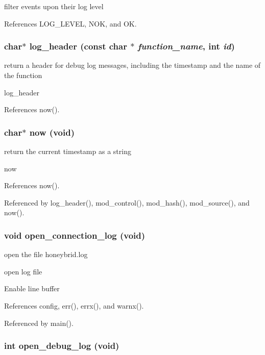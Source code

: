 filter events upon their log level 

References LOG\_\-LEVEL, NOK, and OK.
\subsubsection[{log\_\-header}]{\setlength{\rightskip}{0pt plus 5cm}char$\ast$ log\_\-header (const char $\ast$ {\em function\_\-name}, \/  int {\em id})}\label{log_8h_8a84b75ac92d0036fd17d2c2705cfcc4}


return a header for debug log messages, including the timestamp and the name of the function 

log\_\-header 

References now().
\subsubsection[{now}]{\setlength{\rightskip}{0pt plus 5cm}char$\ast$ now (void)}\label{log_8h_525a63699478a5fa4357ef2d774a2b24}


return the current timestamp as a string 

now 

References now().

Referenced by log\_\-header(), mod\_\-control(), mod\_\-hash(), mod\_\-source(), and now().
\subsubsection[{open\_\-connection\_\-log}]{\setlength{\rightskip}{0pt plus 5cm}void open\_\-connection\_\-log (void)}\label{log_8h_4a1770ab07387e6e7c9bc7b7d188e336}


open the file honeybrid.log 

open log file 

Enable line buffer 

References config, err(), errx(), and warnx().

Referenced by main().
\subsubsection[{open\_\-debug\_\-log}]{\setlength{\rightskip}{0pt plus 5cm}int open\_\-debug\_\-log (void)}\label{log_8h_7a776449460252a9e0bdc4b407f3709a}




